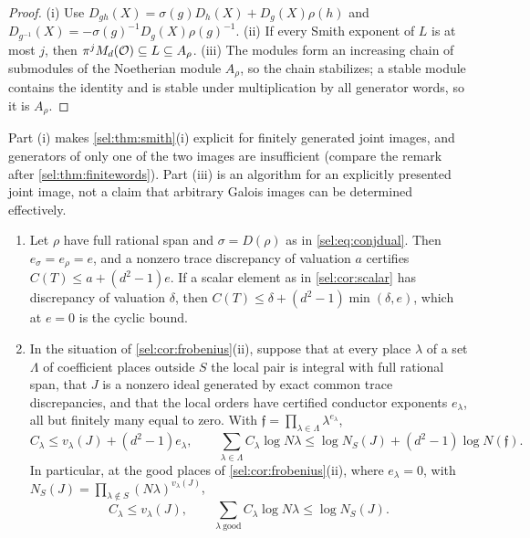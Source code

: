 \begin{proof}
(i) Use $D_{gh}(X)=\sigma(g)D_h(X)+D_g(X)\rho(h)$ and
$D_{g^{-1}}(X)=-\sigma(g)^{-1}D_g(X)\rho(g)^{-1}$. (ii) If every Smith
exponent of $L$ is at most $j$, then $\pi^jM_d(\mathcal{O})\subseteq L\subseteq A_\rho$.
(iii) The modules form an increasing chain of submodules of the
Noetherian module $A_\rho$, so the chain stabilizes; a stable module contains
the identity and is stable under multiplication by all generator words, so
it is $A_\rho$.
\end{proof}

Part (i) makes \cref{sel:thm:smith}(i) explicit for finitely generated joint
images, and generators of only one of the two images are insufficient
(compare the remark after \cref{sel:thm:finitewords}). Part (iii) is an
algorithm for an explicitly presented joint image, not a claim that
arbitrary Galois images can be determined effectively.

\begin{corollary}\label{sel:cor:badprimes}
\leavevmode
\begin{enumerate}[label=\textup{(\roman*)}]
\item Let $\rho$ have full rational span and $\sigma=D(\rho)$ as in
 \eqref{sel:eq:conjdual}. Then $e_\sigma=e_\rho=e$, and a nonzero trace
 discrepancy of valuation $a$ certifies $C(T)\le a+(d^2-1)e$. If a scalar
 element as in \cref{sel:cor:scalar} has discrepancy of valuation $\delta$,
 then $C(T)\le\delta+(d^2-1)\min(\delta,e)$, which at $e=0$ is the cyclic
 bound.
\item In the situation of \cref{sel:cor:frobenius}\textup{(ii)}, suppose
 that at every place $\lambda$ of a set $\Lambda$ of coefficient places
 outside $S$ the local pair is integral with full rational span, that
 $J$ is a nonzero ideal generated by exact common trace discrepancies, and
 that the local orders have certified conductor exponents $e_\lambda$, all
 but finitely many equal to zero. With
 $\mathfrak f=\prod_{\lambda\in\Lambda}\lambda^{e_\lambda}$,
 \[
  C_\lambda\le v_\lambda(J)+(d^2-1)e_\lambda,\qquad
  \sum_{\lambda\in\Lambda}C_\lambda\log N\lambda\le\log N_S(J)+(d^2-1)\log N(\mathfrak f).
 \]
 In particular, at the good places of \cref{sel:cor:frobenius}\textup{(ii)},
 where $e_\lambda=0$, with $N_S(J)=\prod_{\lambda\notin S}(N\lambda)^{v_\lambda(J)}$,
 \begin{equation}\label{sel:eq:idealbound}
  C_\lambda\le v_\lambda(J),\qquad
  \sum_{\lambda\ \mathrm{good}}C_\lambda\log N\lambda\le\log N_S(J).
 \end{equation}
\end{enumerate}
\end{corollary}

